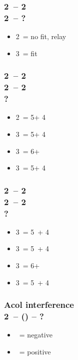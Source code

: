 \subsubsection*{2\clubs\ -- 2\diams \\ 2\spades\ -- ?}
\begin{itemize}
    \item 2\nt\ = no fit, relay
    \item 3\spades\ = fit
\end{itemize}

\subsubsection*{2\clubs\ -- 2\diams \\ 
                2\hearts\ -- 2\spades \\
                ?}
\begin{itemize}
    \item 2\nt\ = 5\hearts + 4\clubs
    \item 3\clubs\ = 5\hearts + 4\diams
    \item 3\diams\ = 6+\hearts
    \item 3\hearts\ = 5\hearts + 4\spades
\end{itemize}

\subsubsection*{2\clubs\ -- 2\diams \\ 
                2\spades\ -- 2\ntx \\
                ?}
\begin{itemize}
    \item 3\clubs\ = 5\spades\ + 4\diams
    \item 3\diams\ = 5\spades\ + 4\hearts
    \item 3\hearts\ = 6+\spades
    \item 3\spades\ = 5\spades\ + 4\clubs
\end{itemize}

\subsubsection*{Acol interference\\
                2\clubs\ -- () -- ?}
\begin{itemize}
    \item \dbl\ = negative
    \item \pass\ = positive
\end{itemize}


